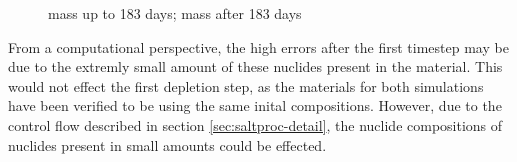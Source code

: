 \begin{figure}[htpb]
    \centering
    \caption{}
    \caption[ mass]{
      mass up to 183 days;
      mass after 183 days}
    \label{fig:cm246-mass}
\end{figure}


From a computational perspective, the high errors after the first timestep may
be due to the extremly small amount of these nuclides present in the material.
This would not effect the first depletion step, as the materials for both
simulations have been verified to be using the same inital compositions.
However, due to the control flow described in section
\ref{sec:saltproc-detail}, the nuclide compositions of nuclides present in
small amounts could be effected.

